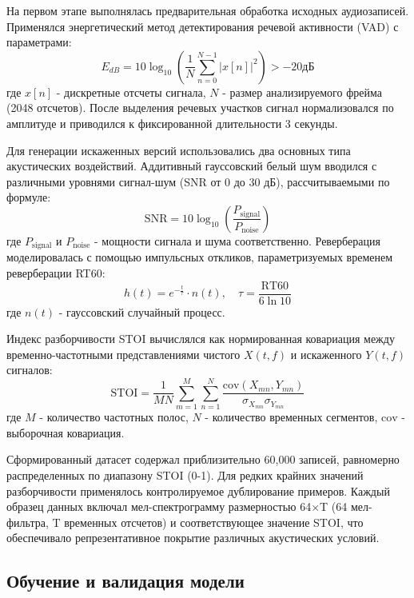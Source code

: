 \documentclass[oneside, final, 14pt]{extarticle}
\begin{document}
На первом этапе выполнялась предварительная обработка исходных аудиозаписей. Применялся энергетический метод детектирования речевой активности (VAD) с параметрами:
\begin{equation}
E_{dB} = 10\log_{10}\left(\frac{1}{N}\sum_{n=0}^{N-1}|x[n]|^2\right) > -20 \text{дБ}
\end{equation}
где $x[n]$ - дискретные отсчеты сигнала, $N$ - размер анализируемого фрейма (2048 отсчетов). После выделения речевых участков сигнал нормализовался по амплитуде и приводился к фиксированной длительности 3 секунды.

Для генерации искаженных версий использовались два основных типа акустических воздействий. Аддитивный гауссовский белый шум вводился с различными уровнями сигнал-шум (SNR от 0 до 30 дБ), рассчитываемыми по формуле:
\begin{equation}
\text{SNR} = 10\log_{10}\left(\frac{P_{\text{signal}}}{P_{\text{noise}}}\right)
\end{equation}
где $P_{\text{signal}}$ и $P_{\text{noise}}$ - мощности сигнала и шума соответственно. Реверберация моделировалась с помощью импульсных откликов, параметризуемых временем реверберации RT60:
\begin{equation}
h(t) = e^{-\frac{t}{\tau}}\cdot n(t), \quad \tau = \frac{\text{RT60}}{6\ln10}
\end{equation}
где $n(t)$ - гауссовский случайный процесс.

Индекс разборчивости STOI вычислялся как нормированная ковариация между временно-частотными представлениями чистого $X(t,f)$ и искаженного $Y(t,f)$ сигналов:
\begin{equation}
\text{STOI} = \frac{1}{MN}\sum_{m=1}^{M}\sum_{n=1}^{N}\frac{\text{cov}(X_{mn},Y_{mn})}{\sigma_{X_{mn}}\sigma_{Y_{mn}}}
\end{equation}
где $M$ - количество частотных полос, $N$ - количество временных сегментов, $\text{cov}$ - выборочная ковариация.

Сформированный датасет содержал приблизительно 60,000 записей, равномерно распределенных по диапазону STOI (0-1). Для редких крайних значений разборчивости применялось контролируемое дублирование примеров. Каждый образец данных включал мел-спектрограмму размерностью 64×T (64 мел-фильтра, T временных отсчетов) и соответствующее значение STOI, что обеспечивало репрезентативное покрытие различных акустических условий.

\subsection{Обучение и валидация модели}
\end{document}

